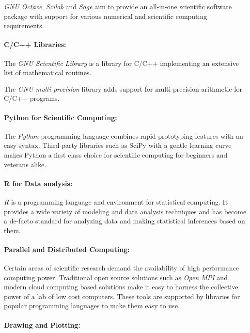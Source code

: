 \documentclass[ifip]{svmult}
\begin{document}
\textit{GNU Octave}, \textit{Scilab} and \textit{Sage} aim to provide
an all-in-one scientific software package with support for various numerical and
scientific computing requirements.

\paragraph{C/C++ Libraries:}

The \textit{GNU Scientific Library} is a library for C/C++
implementing an extensive list of mathematical routines. 

The \textit{GNU multi precision} library adds support for
multi-precision arithmetic for C/C++ programs.

\paragraph{Python for Scientific Computing:}

The \textit{Python} programming language combines rapid prototyping
features with an easy syntax. Third party libraries such
as SciPy with a gentle learning curve makes Python a first class
choice for scientific computing for beginners and veterans alike.

\paragraph{R for Data analysis:}

\textit{R} is a programming language and environment for statistical
computing. It provides a wide variety of modeling and data analysis
techniques and has become a de-facto standard for analyzing data and
making statistical inferences based on them.

\paragraph{Parallel and Distributed Computing:}

Certain areas of scientific research demand the availability of high
performance computing power. Traditional open source solutions such as
\textit{Open MPI} and modern cloud computing based solutions make it
easy to harness the collective power of a lab of low cost
computers. These tools are supported by libraries for popular
programming languages to make them easy to use.

\paragraph{Drawing and Plotting:}
\end{document}
